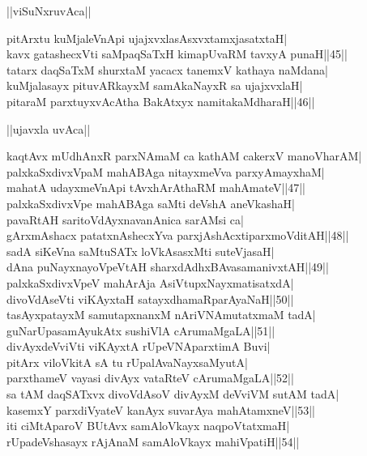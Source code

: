 \documentclass{article}
\begin{document}
\begin{center}
||viSuNxruvAca||
\end{center}

pitArxtu kuMjaleVnApi ujajxvxlasAsxvxtamxjasatxtaH|\\
kavx gatashecxVti saMpaqSaTxH kimapUvaRM tavxyA punaH||45||\\
tatarx daqSaTxM shurxtaM yacacx tanemxV kathaya naMdana|\\
kuMjalasayx pituvARkayxM samAkaNayxR sa ujajxvxlaH|\\
pitaraM parxtuyxvAcAtha BakAtxyx namitakaMdharaH||46||\\

\begin{center}
||ujavxla uvAca||
\end{center}

kaqtAvx mUdhAnxR parxNAmaM ca kathAM cakerxV manoVharAM|\\
palxkaSxdivxVpaM mahABAga nitayxmeVva parxyAmayxhaM|\\
mahatA udayxmeVnApi tAvxhArAthaRM mahAmateV||47||\\
palxkaSxdivxVpe mahABAga saMti deVshA aneVkashaH|\\
pavaRtAH saritoVdAyxnavanAnica sarAMsi ca|\\
gArxmAshacx patatxnAshecxYva parxjAshAcxtiparxmoVditAH||48||\\
sadA siKeVna saMtuSATx loVkAsasxMti suteVjasaH|\\
dAna puNayxnayoVpeVtAH sharxdAdhxBAvasamanivxtAH||49||\\
palxkaSxdivxVpeV mahArAja AsiVtupxNayxmatisatxdA|\\
divoVdAseVti viKAyxtaH satayxdhamaRparAyaNaH||50||\\
tasAyxpatayxM samutapxnanxM nAriVNAmutatxmaM tadA|\\
guNarUpasamAyukAtx sushiVlA cArumaMgaLA||51||\\
divAyxdeVviVti viKAyxtA rUpeVNAparxtimA Buvi|\\
pitArx viloVkitA sA tu rUpalAvaNayxsaMyutA|\\
parxthameV vayasi divAyx vataRteV cArumaMgaLA||52||\\
sa tAM daqSATxvx divoVdAsoV divAyxM deVviVM sutAM tadA|\\
kasemxY parxdiVyateV kanAyx suvarAya mahAtamxneV||53||\\
iti ciMtAparoV BUtAvx samAloVkayx naqpoVtatxmaH|\\
rUpadeVshasayx rAjAnaM samAloVkayx mahiVpatiH||54||\\
\end{document}
